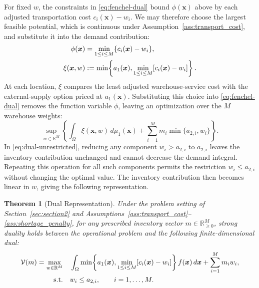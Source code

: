 \documentclass[a4paper,fleqn]{cas-sc}
\newtheorem{theorem}{Theorem}
\theoremstyle{remark}
\theoremstyle{plain}
\begin{document}
For fixed $w$, the constraints in \eqref{eq:fenchel-dual} bound $\phi(\bm x)$ above by each adjusted transportation cost $c_i(\bm x)-w_i$. We may therefore choose the largest feasible potential, which is continuous under Assumption~\ref{ass:transport_cost}, and substitute it into the demand contribution:
\begin{align}
    \phi(\bm x)&=\min_{1\le i\le M}\{c_i(\bm x)-w_i\},\notag\\
    \xi(\bm x,w)&:=\min\!\left\{a_1(\bm x),\min_{1\le i\le M}[c_i(\bm x)-w_i]\right\}.
    \label{eq:dual-integrand}
\end{align}
At each location, $\xi$ compares the least adjusted warehouse-service cost with the external-supply option priced at $a_1(\bm x)$. Substituting this choice into \eqref{eq:fenchel-dual} removes the function variable $\phi$, leaving an optimization over the $M$ warehouse weights:
\begin{equation}\label{eq:dual-unrestricted}
    \sup_{w\in\mathbb R^M}\left\{\int_\Omega\xi(\bm x,w)\,d\mu_1(\bm x)+\sum_{i=1}^M m_i\min\{a_{2,i},w_i\}\right\}.
\end{equation}
In \eqref{eq:dual-unrestricted}, reducing any component $w_i>a_{2,i}$ to $a_{2,i}$ leaves the inventory contribution unchanged and cannot decrease the demand integral. Repeating this operation for all such components permits the restriction $w_i\le a_{2,i}$ without changing the optimal value. The inventory contribution then becomes linear in $w$, giving the following representation.

\begin{theorem}[Dual Representation]\label{thm:dual_representation}
Under the problem setting of Section~\ref{sec:section2} and Assumptions~\ref{ass:transport_cost}--\ref{ass:shortage_penalty}, for any prescribed inventory vector $m\in\mathbb R_{\ge0}^M$, strong duality holds between the operational problem and the following finite-dimensional dual:
\begin{subequations}\label{eq:operational-dual}
\allowdisplaybreaks[0]
\begin{align}
    \mathcal V(m)=\max_{w\in\mathbb R^M}\quad
        &\int_\Omega\min\!\left\{a_1(\bm x),\min_{1\le i\le M}[c_i(\bm x)-w_i]\right\}f(\bm x)\,d\bm x+\sum_{i=1}^M m_iw_i,
        \label{eq:operational-dual-objective}\\
    \text{s.t.}\quad
        &w_i\le a_{2,i},\qquad i=1,\ldots,M.
        \label{eq:operational-dual-constraints}
\end{align}
\end{subequations}
\end{theorem}
\end{document}
